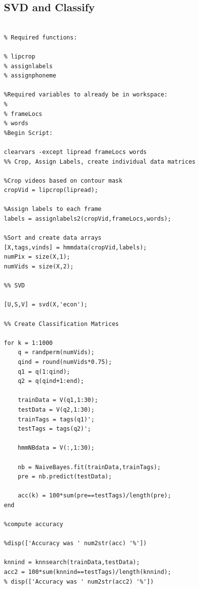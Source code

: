 \documentclass[a4paper,11pt]{article}
\begin{document}
\subsection{SVD and Classify}
\begin{lstlisting}[style=myMatlabstyle]

% Required functions:

% lipcrop
% assignlabels
% assignphoneme

%Required variables to already be in workspace:
% 
% frameLocs
% words
%Begin Script:

clearvars -except lipread frameLocs words
%% Crop, Assign Labels, create individual data matrices

%Crop videos based on contour mask
cropVid = lipcrop(lipread);

%Assign labels to each frame
labels = assignlabels2(cropVid,frameLocs,words);

%Sort and create data arrays
[X,tags,vinds] = hmmdata(cropVid,labels);
numPix = size(X,1);
numVids = size(X,2);

%% SVD

[U,S,V] = svd(X,'econ');

%% Create Classification Matrices

for k = 1:1000
    q = randperm(numVids);
    qind = round(numVids*0.75);
    q1 = q(1:qind);
    q2 = q(qind+1:end);
    
    trainData = V(q1,1:30);
    testData = V(q2,1:30);
    trainTags = tags(q1)';
    testTags = tags(q2)';
    
    hmmNBdata = V(:,1:30);
    
    nb = NaiveBayes.fit(trainData,trainTags);
    pre = nb.predict(testData);
    
    acc(k) = 100*sum(pre==testTags)/length(pre);
end

%compute accuracy

%disp(['Accuracy was ' num2str(acc) '%'])

knnind = knnsearch(trainData,testData);
acc2 = 100*sum(knnind==testTags)/length(knnind);
% disp(['Accuracy was ' num2str(acc2) '%'])

\end{lstlisting}
\end{document}
